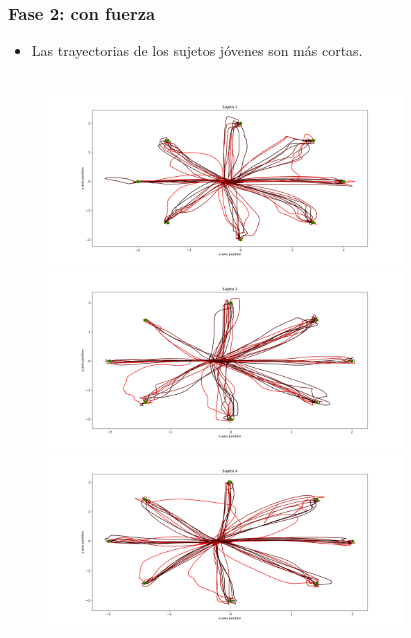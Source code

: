 \documentclass[pdf]{beamer}
\begin{document}
\begin{frame}
	\frametitle{Fase 2: con fuerza}
		\begin{itemize}
		\item Las trayectorias de los sujetos jóvenes son más cortas.
	\end{itemize}
\begin{columns}
	\begin{column}{0.5\textwidth}
		\begin{figure}[t]
			\includegraphics[width=0.88\textwidth]{sujeto1/force/trayectorias}
			\includegraphics[width=0.88\textwidth]{sujeto2/force/trayectorias}
			\includegraphics[width=0.88\textwidth]{sujeto4/force/trayectorias}
		\end{figure}
	\end{column}
\begin{column}{0.5\textwidth}

\end{column}
\end{columns}
\end{frame}
\end{document}
